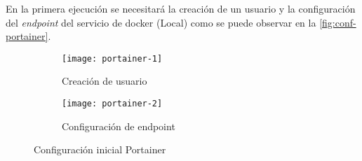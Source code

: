 \documentclass[../../main.tex]{subfiles}
\begin{document}
 En la primera ejecución se necesitará la creación de un usuario y la configuración del \textit{endpoint} del servicio de docker (Local) como se puede observar en la \autoref{fig:conf-portainer}.
 
 \begin{figure}[H]
  \centering
  \begin{subfigure}[b]{0.40\linewidth}
    \texttt{[image: portainer-1]}
    \caption{Creación de usuario}
  \end{subfigure}\hfill
  \begin{subfigure}[b]{0.45\linewidth}
    \texttt{[image: portainer-2]}
    \caption{Configuración de endpoint}
  \end{subfigure}
  \caption{Configuración inicial Portainer}
  \label{fig:conf-portainer}
\end{figure}
\end{document}
